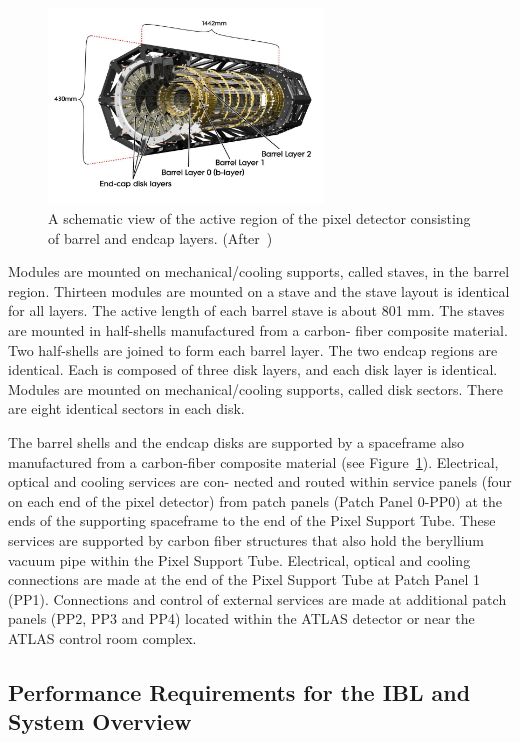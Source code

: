 \begin{figure}[!htpb]
\centering
\includegraphics[width=0.65\textwidth]{pixstruc.png}
\caption{\label{fig:pixstruc} A schematic view of the active region of the pixel detector consisting of barrel and endcap layers. (After~\cite{AtlasPixels})}
\end{figure}

Modules are mounted on mechanical/cooling supports, called staves, in the barrel region. Thirteen 
modules are mounted on a stave and the stave layout is identical for all layers. The active length of 
each barrel stave is about 801 mm. The staves are mounted in half-shells manufactured from a carbon-
fiber composite material. Two half-shells are joined to form each barrel layer.
The two endcap regions are identical. Each is composed of three disk layers, and each disk layer is 
identical. Modules are mounted on mechanical/cooling supports, called disk sectors. There are eight 
identical sectors in each disk.

The barrel shells and the endcap disks are supported by a spaceframe also manufactured from a 
carbon-fiber composite material (see Figure~\ref{fig:pixstruc}). Electrical, optical and cooling services 
are con- nected and routed within service panels (four on each end of the pixel detector) from patch 
panels (Patch Panel 0-PP0) at the ends of the supporting spaceframe to the end of the Pixel Support 
Tube.
These services are supported by carbon fiber structures that also hold the beryllium vacuum pipe within 
the Pixel Support Tube. Electrical, optical and cooling connections are made at the end of the Pixel 
Support Tube at Patch Panel 1 (PP1). Connections and control of external services are made at 
additional patch panels (PP2, PP3 and PP4) located within the ATLAS detector or near the ATLAS 
control room complex.

\subsection{Performance Requirements for the IBL and System Overview}
\label{sec:IBLoverview}


